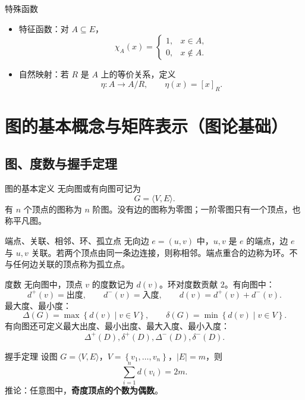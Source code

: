 \documentclass[UTF8,zihao=-4]{ctexart}
\newcommand{\kw}[1]{\textbf{\color{main}#1}}
\newcommand{\set}[1]{\left\{#1\right\}}
\begin{document}
\begin{corebox}{特殊函数}
\begin{itemize}
  \item 特征函数：对 $A\subseteq E$，
  \[
  \chi_A(x)=\begin{cases}1,&x\in A,\\0,&x\notin A.
  \end{cases}
  \]
  \item 自然映射：若 $R$ 是 $A$ 上的等价关系，定义
  \[
  \eta:A\to A/R,\qquad \eta(x)=[x]_R.
  \]
\end{itemize}
\end{corebox}

\section{图的基本概念与矩阵表示（图论基础）}

\subsection{图、度数与握手定理}

\begin{corebox}{图的基本定义}
无向图或有向图可记为
\[
G=\langle V,E\rangle.
\]
有 $n$ 个顶点的图称为 $n$ 阶图。没有边的图称为零图；一阶零图只有一个顶点，也称平凡图。
\end{corebox}

\begin{corebox}{端点、关联、相邻、环、孤立点}
无向边 $e=(u,v)$ 中，$u,v$ 是 $e$ 的端点，边 $e$ 与 $u,v$ 关联。若两个顶点由同一条边连接，则称相邻。端点重合的边称为环。不与任何边关联的顶点称为孤立点。
\end{corebox}

\begin{corebox}{度数}
无向图中，顶点 $v$ 的度数记为 $d(v)$。环对度数贡献 $2$。有向图中：
\[
d^+(v)=\text{出度},\qquad d^-(v)=\text{入度},\qquad d(v)=d^+(v)+d^-(v).
\]
最大度、最小度：
\[
\Delta(G)=\max\set{d(v)\mid v\in V},\qquad
\delta(G)=\min\set{d(v)\mid v\in V}.
\]
有向图还可定义最大出度、最小出度、最大入度、最小入度：
\[
\Delta^+(D),\delta^+(D),\Delta^-(D),\delta^-(D).
\]
\end{corebox}

\begin{corebox}{握手定理}
设图 $G=\langle V,E\rangle$，$V=\set{v_1,\ldots,v_n}$，$|E|=m$，则
\[
\sum_{i=1}^n d(v_i)=2m.
\]
推论：任意图中，\kw{奇度顶点的个数为偶数}。
\end{corebox}
\end{document}
